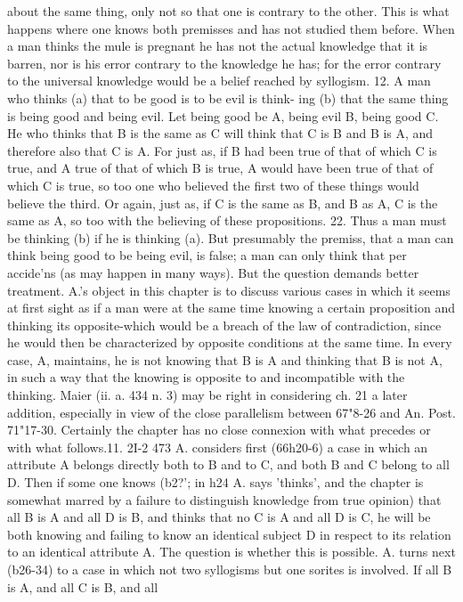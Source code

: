 {{{{{{{about the same thing, only not so that one is contrary to the
other. This is what happens where one knows both premisses and
has not studied them before. When a man thinks the mule is
pregnant he has not the actual knowledge that it is barren, nor is
his error contrary to the knowledge he has; for the error contrary
to the universal knowledge would be a belief reached by syllogism.
12. A man who thinks (a) that to be good is to be evil is think-
ing (b) that the same thing is being good and being evil. Let
being good be A, being evil B, being good C. He who thinks that
B is the same as C will think that C is B and B is A, and therefore
also that C is A. For just as, if B had been true of that of which C
is true, and A true of that of which B is true, A would have been
true of that of which C is true, so too one who believed the first two
of these things would believe the third. Or again, just as, if C
is the same as B, and B as A, C is the same as A, so too with the
believing of these propositions.
22. Thus a man must be thinking (b) if he is thinking (a). But
presumably the premiss, that a man can think being good to be
being evil, is false; a man can only think that per accide'ns (as
may happen in many ways). But the question demands better
treatment.
A.'s object in this chapter is to discuss various cases in which
it seems at first sight as if a man were at the same time knowing
a certain proposition and thinking its opposite-which would be
a breach of the law of contradiction, since he would then be
characterized by opposite conditions at the same time. In every
case, A, maintains, he is not knowing that B is A and thinking
that B is not A, in such a way that the knowing is opposite to and
incompatible with the thinking.
Maier (ii. a. 434 n. 3) may be right in considering ch. 21 a later
addition, especially in view of the close parallelism between
67"8-26 and An. Post. 71"17-30. Certainly the chapter has no
close connexion with what precedes or with what follows.11. 2I-2
473
A. considers first (66h20-6) a case in which an attribute A
belongs directly both to B and to C, and both B and C belong
to all D. Then if some one knows (b2?'; in h24 A. says 'thinks',
and the chapter is somewhat marred by a failure to distinguish
knowledge from true opinion) that all B is A and all D is B,
and thinks that no C is A and all D is C, he will be both knowing
and failing to know an identical subject D in respect to its
relation to an identical attribute A. The question is whether
this is possible.
A. turns next (b26-34) to a case in which not two syllogisms
but one sorites is involved. If all B is A, and all C is B, and all
}}}}}}}
